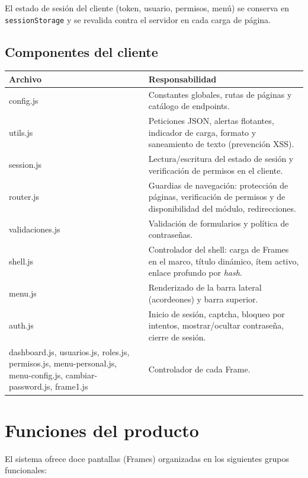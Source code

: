 El estado de sesión del cliente (token, usuario, permisos, menú) se conserva
en \texttt{sessionStorage} y se revalida contra el servidor en cada carga de
página.

\subsection{Componentes del cliente}

\begin{longtable}{|>{\ttfamily}p{4.2cm}|p{10.4cm}|}
\hline
\rowcolor{azulcorp!15} \textbf{Archivo} & \textbf{Responsabilidad} \\ \hline
\endhead
config.js & Constantes globales, rutas de páginas y catálogo de endpoints. \\ \hline
utils.js & Peticiones JSON, alertas flotantes, indicador de carga, formato y
           saneamiento de texto (prevención XSS). \\ \hline
session.js & Lectura/escritura del estado de sesión y verificación de
             permisos en el cliente. \\ \hline
router.js & Guardias de navegación: protección de páginas, verificación de
            permisos y de disponibilidad del módulo, redirecciones. \\ \hline
validaciones.js & Validación de formularios y política de contraseñas. \\ \hline
shell.js & Controlador del shell: carga de Frames en el marco, título
           dinámico, ítem activo, enlace profundo por \textit{hash}. \\ \hline
menu.js & Renderizado de la barra lateral (acordeones) y barra superior. \\ \hline
auth.js & Inicio de sesión, captcha, bloqueo por intentos, mostrar/ocultar
          contraseña, cierre de sesión. \\ \hline
dashboard.js, usuarios.js, roles.js, permisos.js, menu-personal.js,
menu-config.js, cambiar-password.js, frame1.js & Controlador de cada Frame. \\ \hline
\end{longtable}

\section{Funciones del producto}

El sistema ofrece doce pantallas (Frames) organizadas en los siguientes
grupos funcionales:


